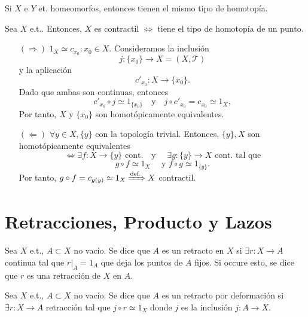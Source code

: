 \begin{obs}
  Si $X$ e $Y$ et. homeomorfos, entonces tienen el mismo tipo de homotopía.
\end{obs}

\begin{prop}
  Sea $X$ e.t.. Entonces, $X$ es contractil $\Leftrightarrow$ tiene el tipo de homotopía de un punto.
\end{prop}

\begin{dem}
  \begin{enumerate}[label=(\roman*)]
    \item []
    \item [$(\Rightarrow)$] $1_{X} \simeq c_{x_{0}} : x_{0} \in X$. Consideramos la inclusión
      \[ 
        j : \{ x_{0} \} \to X = ( X, \mathcal{T} ) 
      \] 
      y la aplicación
      \[ 
        c'_{x_{0}} : X \to \{ x_{0} \}.
      \] 
      Dado que ambas son continuas, entonces
      \[
        c'_{x_{0}} \circ j \simeq 1_{\{ x_{0} \}} \quad \text{y} \quad j \circ c'_{x_{0}} = c_{x_{0}} \simeq 1_{X},
      \]
      Por tanto, $X$ y $\{ x_{0} \}$ son homotópicamente equivalentes.
    \item [$(\Leftarrow)$] $\forall y \in X, \{ y \}$ con la topología trivial. Entonces, $\{ y \}, X$ son homotópicamente equivalentes
      \[
        \Leftrightarrow \exists f : X \to \{ y \} \text{ cont.} \quad \text{y } \quad \exists g : \{ y \} \to X \text{ cont.} \text{ tal que}
      \]
      \[
        g \circ f \simeq 1_{X} \quad \text{ y } f \circ g \simeq 1_{\{ y \}}.
      \]
      Por tanto, $g \circ f = c_{g(y)} \simeq 1_{X} \xRightarrow[]{ \text{def.} } X$ contractil.

  \end{enumerate}
\end{dem}

\section{Retracciones, Producto y Lazos}

\begin{defn}[Retracción]
  Sea $X$ e.t., $A \subset X$ no vacío. Se dice que $A$ es un retracto en $X$ si $\exists r : X \to A$ continua tal que $r|_{A} = 1_{A}$ que deja los puntos de $A$ fijos. Si occure esto, se dice que $r$ es una retracción de $X$ en $A$.
\end{defn}

\begin{defn}
  Sea $X$ e.t., $A \subset X$ no vacío. Se dice que $A$ es un retracto por deformación si $\exists r : X \to A$ retracción tal que $j \circ r \simeq 1_{X}$ donde $j$ es la inclusión $j : A \to X$.
\end{defn}
